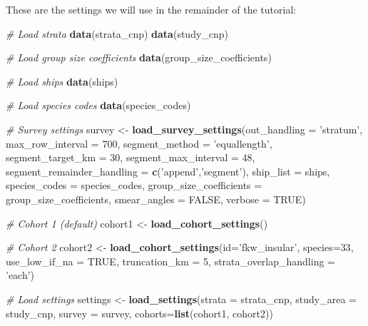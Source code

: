 \documentclass[
]{book}
\newenvironment{Shaded}{\begin{snugshade}}{\end{snugshade}}
\newcommand{\CommentTok}[1]{\textcolor[rgb]{0.56,0.35,0.01}{\textit{#1}}}
\newcommand{\DataTypeTok}[1]{\textcolor[rgb]{0.13,0.29,0.53}{#1}}
\newcommand{\DecValTok}[1]{\textcolor[rgb]{0.00,0.00,0.81}{#1}}
\newcommand{\KeywordTok}[1]{\textcolor[rgb]{0.13,0.29,0.53}{\textbf{#1}}}
\newcommand{\NormalTok}[1]{#1}
\newcommand{\OtherTok}[1]{\textcolor[rgb]{0.56,0.35,0.01}{#1}}
\newcommand{\StringTok}[1]{\textcolor[rgb]{0.31,0.60,0.02}{#1}}
\begin{document}
These are the settings we will use in the remainder of the tutorial:

\begin{Shaded}
\begin{Highlighting}[]
\CommentTok{# Load strata}
\KeywordTok{data}\NormalTok{(strata_cnp)}
\KeywordTok{data}\NormalTok{(study_cnp)}

\CommentTok{# Load group size coefficients}
\KeywordTok{data}\NormalTok{(group_size_coefficients)}

\CommentTok{# Load ships}
\KeywordTok{data}\NormalTok{(ships)}

\CommentTok{# Load species codes}
\KeywordTok{data}\NormalTok{(species_codes)}

\CommentTok{# Survey settings}
\NormalTok{survey <-}\StringTok{ }
\StringTok{  }\KeywordTok{load_survey_settings}\NormalTok{(}\DataTypeTok{out_handling =} \StringTok{'stratum'}\NormalTok{,}
                       \DataTypeTok{max_row_interval =} \DecValTok{700}\NormalTok{,}
                       \DataTypeTok{segment_method =} \StringTok{'equallength'}\NormalTok{,}
                       \DataTypeTok{segment_target_km =} \DecValTok{30}\NormalTok{,}
                       \DataTypeTok{segment_max_interval =} \DecValTok{48}\NormalTok{,}
                       \DataTypeTok{segment_remainder_handling =} \KeywordTok{c}\NormalTok{(}\StringTok{'append'}\NormalTok{,}\StringTok{'segment'}\NormalTok{),}
                       \DataTypeTok{ship_list =}\NormalTok{ ships,}
                       \DataTypeTok{species_codes =}\NormalTok{ species_codes,}
                       \DataTypeTok{group_size_coefficients =}\NormalTok{ group_size_coefficients,}
                       \DataTypeTok{smear_angles =} \OtherTok{FALSE}\NormalTok{,}
                       \DataTypeTok{verbose =} \OtherTok{TRUE}\NormalTok{)}

\CommentTok{# Cohort 1 (default)}
\NormalTok{cohort1 <-}\StringTok{ }\KeywordTok{load_cohort_settings}\NormalTok{()}

\CommentTok{# Cohort 2}
\NormalTok{cohort2 <-}\StringTok{ }
\StringTok{  }\KeywordTok{load_cohort_settings}\NormalTok{(}\DataTypeTok{id=}\StringTok{'fkw_insular'}\NormalTok{,}
                       \DataTypeTok{species=}\DecValTok{33}\NormalTok{,}
                       \DataTypeTok{use_low_if_na =} \OtherTok{TRUE}\NormalTok{,}
                       \DataTypeTok{truncation_km =} \DecValTok{5}\NormalTok{,}
                       \DataTypeTok{strata_overlap_handling =} \StringTok{'each'}\NormalTok{)}

\CommentTok{# Load settings}
\NormalTok{settings <-}\StringTok{ }\KeywordTok{load_settings}\NormalTok{(}\DataTypeTok{strata =}\NormalTok{ strata_cnp,}
                          \DataTypeTok{study_area =}\NormalTok{ study_cnp,}
                          \DataTypeTok{survey =}\NormalTok{ survey,}
                          \DataTypeTok{cohorts=}\KeywordTok{list}\NormalTok{(cohort1,}
\NormalTok{                                       cohort2))}
\end{Highlighting}
\end{Shaded}
\end{document}
